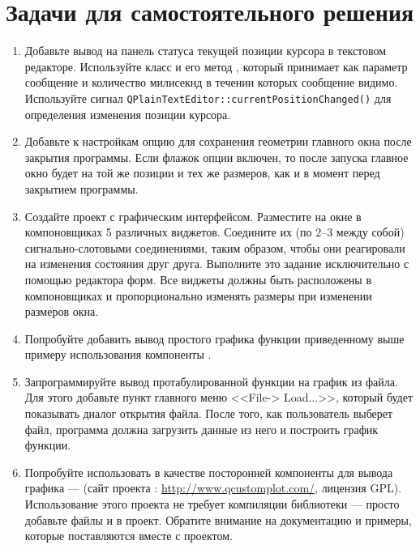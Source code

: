 \section[Задачи для самостоятельного решения]{Задачи для самостоятельного решения}
\begin{enumerate}
\item Добавьте вывод на панель статуса текущей позиции курсора в текстовом редакторе. Используйте класс  и его
метод , который принимает как параметр сообщение и количество милисекнд в течении которых сообщение
видимо. Используйте сигнал \lstinline!QPlainTextEditor::currentPositionChanged()! для определения изменения позиции курсора.
\item Добавьте к настройкам опцию для сохранения геометрии главного окна после закрытия программы. Если флажок опции
включен, то после запуска главное окно будет на той же позиции и тех же размеров, как и в момент перед закрытием
программы. 
\item Создайте проект с графическим интерфейсом. Разместите на окне в компоновщиках 5 различных виджетов. Соедините их
(по 2--3 между собой) сигнально-слотовыми соединениями, таким образом, чтобы они реагировали на изменения состояния друг
друга. Выполните это задание исключительно с помощью редактора форм. Все виджеты должны быть расположены в
компоновщиках и пропорционально изменять размеры при изменении размеров окна.
\item Попробуйте добавить вывод простого графика функции приведенному выше примеру использования компоненты .
\item Запрограммируйте вывод протабулированной функции на график из файла. Для этого добавьте пункт главного меню
<<File-> Load...>>, который будет показывать диалог открытия файла. После того, как
пользователь выберет файл, программа должна загрузить данные из него и построить график функции.
\item Попробуйте использовать в качестве посторонней компоненты для вывода графика  ---  (сайт проекта :
\url{http://www.qcustomplot.com/}, лицензия GPL). Использование этого проекта не требует компиляции библиотеки --- просто
добавьте файлы  и   в проект. Обратите внимание на документацию и примеры, которые
поставляются вместе с проектом.
\end{enumerate}
